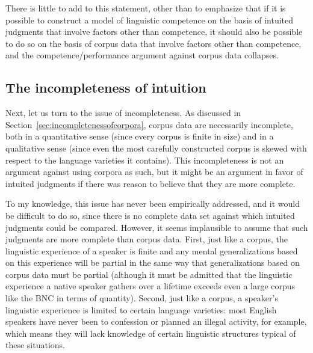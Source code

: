 There is little to add to this statement, other than to emphasize that if it is possible to construct a model of linguistic competence  on the basis of intuited  judgments that involve factors other than competence, it should also be possible to do so on the basis of corpus data that involve factors other than competence, and the competence\slash performance argument against corpus data collapses.

\subsection{The incompleteness of intuition}
\label{sec:incompletenessofintuition}

Next, let us turn to the issue of incompleteness. As discussed in Section~\ref{sec:incompletenessofcorpora}, corpus data are necessarily incomplete, both in a quantitative sense (since every corpus is finite in size)  and in a qualitative sense (since even the most carefully constructed corpus is skewed with respect to the language varieties  it contains). This incompleteness is not an argument against using corpora as such, but it might be an argument in favor of intuited  judgments if there was reason to believe that they are more complete.

To my knowledge, this issue has never been empirically addressed, and it would be difficult to do so, since there is no complete data set against which intuited  judgments could be compared. However, it seems implausible to assume that such judgments are more complete than corpus data. First, just like a corpus, the linguistic experience of a speaker is finite and any mental generalizations based on this experience will be partial in the same way that generalizations based on corpus data must be partial (although it must be admitted that the linguistic experience a native speaker gathers over a lifetime exceeds even a large  corpus like the BNC  in terms of quantity). Second, just like a corpus, a speaker's linguistic experience is limited to certain language varieties:  most English speakers have never been to confession or planned an illegal activity, for example, which means they will lack knowledge of certain linguistic structures typical of these situations.

